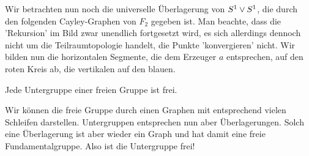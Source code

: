 \begin{example}
    Wir betrachten nun noch die universelle Überlagerung von $S^1 \vee S^1$, die durch den folgenden Cayley-Graphen von $F_2$ gegeben ist. Man beachte, dass die 'Rekursion' im Bild zwar unendlich fortgesetzt wird, es sich allerdings dennoch nicht um die Teilraumtopologie handelt, die Punkte 'konvergieren' nicht. Wir bilden nun die horizontalen Segmente, die dem Erzeuger $a$ entsprechen, auf den roten Kreis ab, die vertikalen auf den blauen.

\end{example}

\begin{corollary}\label{cor:untergruppe-von-freier-gruppe-ist-frei}
    Jede Untergruppe einer freien Gruppe ist frei.
\end{corollary}
\begin{proof*}
    Wir können die freie Gruppe durch einen Graphen mit entsprechend vielen Schleifen darstellen. Untergruppen entsprechen nun aber Überlagerungen. Solch eine Überlagerung ist aber  wieder ein Graph und hat damit eine freie Fundamentalgruppe. Also ist die Untergruppe frei!
\end{proof*}

